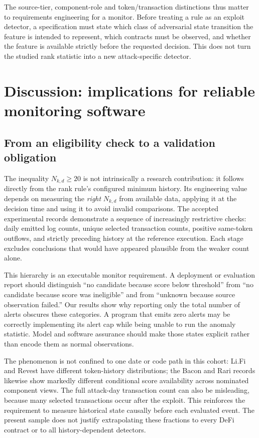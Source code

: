 \documentclass[preprint,12pt,authoryear]{elsarticle}
\begin{document}
The source-tier, component-role and token/transaction distinctions thus matter to requirements engineering for a monitor. Before treating a rule as an exploit detector, a specification must state which class of adversarial state transition the feature is intended to represent, which contracts must be observed, and whether the feature is available strictly before the requested decision. This does not turn the studied rank statistic into a new attack-specific detector.

\section{Discussion: implications for reliable monitoring software}\label{sec:discussion}

\subsection{From an eligibility check to a validation obligation}
The inequality $N_{k,d}\geq20$ is not intrinsically a research contribution: it follows directly from the rank rule's configured minimum history. Its engineering value depends on measuring the \emph{right} $N_{k,d}$ from available data, applying it at the decision time and using it to avoid invalid comparisons. The accepted experimental records demonstrate a sequence of increasingly restrictive checks: daily emitted log counts, unique selected transaction counts, positive same-token outflows, and strictly preceding history at the reference execution. Each stage excludes conclusions that would have appeared plausible from the weaker count alone.

This hierarchy is an executable monitor requirement. A deployment or evaluation report should distinguish ``no candidate because score below threshold'' from ``no candidate because score was ineligible'' and from ``unknown because source observation failed.'' Our results show why reporting only the total number of alerts obscures these categories. A program that emits zero alerts may be correctly implementing its alert cap while being unable to run the anomaly statistic. Model and software assurance should make those states explicit rather than encode them as normal observations.

The phenomenon is not confined to one date or code path in this cohort: Li.Fi and Revest have different token-history distributions; the Bacon and Rari records likewise show markedly different conditional score availability across nominated component views. The full attack-day transaction count can also be misleading, because many selected transactions occur after the exploit. This reinforces the requirement to measure historical state causally before each evaluated event. The present sample does not justify extrapolating these fractions to every DeFi contract or to all history-dependent detectors.
\end{document}
